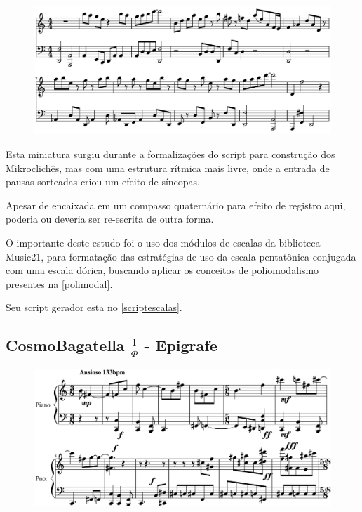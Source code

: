 \documentclass[
	12pt,				%
	openright,			%
	twoside,			%
	a4paper,			%
	english,			%
	french,				%
	spanish,			%
	brazil				%
	]{abntex2}
\begin{document}
\begin{figure}[!h]
	\begin{center}
	    \includegraphics*[scale=0.4]{score/ExperimentoPentatonico.png}
	\end{center}
\end{figure}


Esta miniatura surgiu durante a formalizações do script para construção dos Mikroclichês, mas com uma estrutura rítmica mais livre, onde a entrada de pausas sorteadas criou um efeito de síncopas.

Apesar de encaixada em um compasso quaternário para efeito de registro aqui, poderia ou deveria ser re-escrita de outra forma.

O importante deste estudo foi o uso dos módulos de escalas da biblioteca Music21, para formatação das estratégias de uso da escala pentatônica conjugada com uma escala dórica, buscando aplicar os conceitos de poliomodalismo presentes na \autoref{polimodal}. 

Seu script gerador esta no \autoref{scriptescalas}.

\subsection{CosmoBagatella $ \frac{1}{\Phi} $ - Epigrafe }

\begin{figure}[!h]
	\begin{center}
	    \includegraphics*[scale=0.4]{score/epigrafe01.png}
	\end{center}
\end{figure}
\pagebreak
\end{document}
